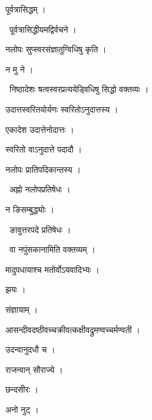 \documentclass[10pt, openany, oneside]{book}
\begin{document}
\noindent पूर्वत्रासिद्धम् ।

\par\noindent\hspace{1.5em}{\vps वा॰}~{\qt पूर्वत्रासिद्धीयमद्विर्वचने ।}

\noindent नलोपः सुप्स्वरसंज्ञातुग्विधिषु कृति ।

\noindent न मु ने ।

\par\noindent\hspace{1.5em}{\vps वा॰}~{\qt निष्ठादेशः षत्वस्वरप्रत्ययेड्विधिषु सिद्धो वक्तव्यः ।}

\noindent उदात्तस्वरितयोर्यणः स्वरितोऽनुदात्तस्य ।

\noindent एकादेश उदात्तेनोदात्तः ।

\noindent स्वरितो वाऽनुदात्ते पदादौ ।

\noindent नलोपः प्रातिपदिकान्तस्य ।

\par\noindent\hspace{1.5em}{\vps वा॰}~{\qt अह्नो नलोपप्रतिषेधः ।}

\noindent न ङिसम्बुद्ध्योः ।

\par\noindent\hspace{1.5em}{\vps वा॰}~{\qt ङावुत्तरपदे प्रतिषेधः ।}

\par\noindent\hspace{1.5em}{\vps वा॰}~{\qt वा नपुंसकानामिति वक्तव्यम् ।}

\noindent मादुपधायाश्च मतोर्वोऽयवादिभ्यः ।

\noindent झयः ।

\noindent संज्ञायाम् ।

\noindent आसन्दीवदष्ठीवच्चक्रीवत्कक्षीवद्रुमण्वच्चर्मण्वती ।

\noindent उदन्वानुदधौ च ।

\noindent राजन्वान् सौराज्ये ।

\noindent छन्दसीरः ।

\noindent अनो नुट् ।
\end{document}

